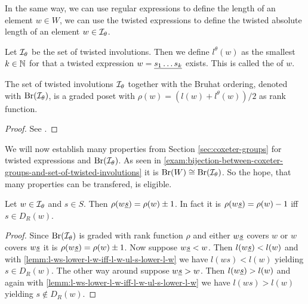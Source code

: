 In the same way, we can use regular expressions to define the length of an element $w \in W$, we can use the twisted expressions to define the twisted absolute length of an element $w \in \mathcal{I}_{\theta}$.

\begin{defi}
	Let $\mathcal{I}_{\theta}$ be the set of twisted involutions. Then we define $l^\theta(w)$ as the smallest $k \in \mathbb{N}$ for that a twisted expression $w = \underline{s_1 \ldots s_k}$ exists. This is called the  of $w$.
\end{defi}

\begin{lemm}
	The set of twisted involutions $\mathcal{I}_{\theta}$ together with the Bruhat ordering, denoted with $\operatorname{Br}(\mathcal{I}_{\theta})$, is a graded poset with $\rho(w) = (l(w) + l^\theta(w))/2$ as rank function.

	\begin{proof}
		See \cite[Theorem 4.8]{hultman:bruhat-order}.
	\end{proof}
\end{lemm}

We will now establish many properties from Section \ref{sec:coxeter-groups} for twisted expressions and $\operatorname{Br}(\mathcal{I}_{\theta})$. As seen in \ref{exam:bijection-between-coxeter-groups-and-set-of-twisted-involutions} it is $\operatorname{Br}(W) \cong \operatorname{Br}(\mathcal{I}_{\theta})$. So the hope, that many properties can be transfered, is eligible.

\begin{lemm}
	Let $w \in \mathcal{I}_{\theta}$ and $s \in S$. Then $\rho(w \underline{s}) = \rho(w) \pm 1$. In fact it is $\rho(w \underline{s}) = \rho(w) - 1$ iff $s \in D_R(w)$.

	\begin{proof}
		Since $\operatorname{Br}(\mathcal{I}_{\theta})$ is graded with rank function $\rho$ and either $w \underline{s}$ covers $w$ or $w$ covers $w \underline{s}$ it is $\rho(w \underline{s}) = \rho(w) \pm 1$. Now suppose $w \underline{s} < w$. Then $l(w \underline{s}) < l(w)$ and with \ref{lemm:l-ws-lower-l-w-iff-l-w-ul-s-lower-l-w} we have $l(w s) < l(w)$ yielding $s \in D_R(w)$. The other way around suppose $w \underline{s} > w$. Then $l(w \underline{s}) > l(w)$ and again with \ref{lemm:l-ws-lower-l-w-iff-l-w-ul-s-lower-l-w} we have $l(w s) > l(w)$ yielding $s \notin D_R(w)$.
	\end{proof}
\end{lemm}


